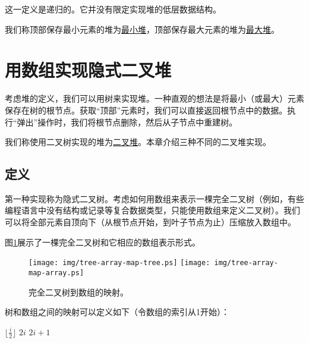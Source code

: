 \documentclass[UTF8]{article}
\begin{document}
这一定义是递归的。它并没有限定实现堆的低层数据结构。

我们称顶部保存最小元素的堆为\underline{最小堆}，顶部保存最大元素的堆为\underline{最大堆}。

\section{用数组实现隐式二叉堆}
\label{ibheap}

考虑堆的定义，我们可以用树来实现堆。一种直观的想法是将最小（或最大）元素保存在树的根节点。获取“顶部”元素时，我们可以直接返回根节点中的数据。执行“弹出”操作时，我们将根节点删除，然后从子节点中重建树。

我们称使用二叉树实现的堆为\underline{二叉堆}。本章介绍三种不同的二叉堆实现。

\subsection{定义}

第一种实现称为隐式二叉树。考虑如何用数组来表示一棵完全二叉树（例如，有些编程语言中没有结构或记录等复合数据类型，只能使用数组来定义二叉树）。我们可以将全部元素自顶向下（从根节点开始，到叶子节点为止）压缩放入数组中。

图\ref{fig:tree-array-map}展示了一棵完全二叉树和它相应的数组表示形式。

\begin{figure}[htbp]
       \begin{center}
       	  \texttt{[image: img/tree-array-map-tree.ps]}
          \texttt{[image: img/tree-array-map-array.ps]}
        \caption{完全二叉树到数组的映射。} \label{fig:tree-array-map}
       \end{center}
\end{figure}

树和数组之间的映射可以定义如下（令数组的索引从1开始）：

\begin{algorithmic}[1]
  \State \Return $\lfloor \frac{i}{2} \rfloor$
\EndFunction
\Statex
{}
  \State \Return $2i$
\EndFunction
\Statex
{}
  \State \Return $2i+1$
\EndFunction
\end{algorithmic}
\end{document}
